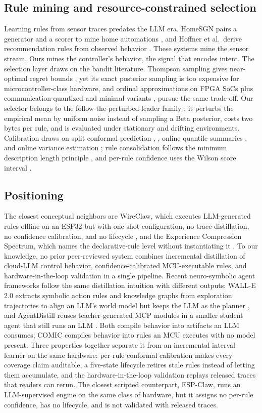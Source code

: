 \documentclass[11pt,a4paper]{article}
\begin{document}
\subsection{Rule mining and resource-constrained selection}

Learning rules from sensor traces predates the LLM era. HomeSGN pairs a
generator and a scorer to mine home automations \cite{15}, and Hoffner et
al.\ derive recommendation rules from observed behavior \cite{16}. These
systems mine the sensor stream. Ours mines the controller's behavior, the
signal that encodes intent. The selection layer draws on the bandit
literature. Thompson sampling gives near-optimal regret bounds \cite{17}, yet
its exact posterior sampling is too expensive for microcontroller-class
hardware, and ordinal approximations on FPGA SoCs \cite{18} plus
communication-quantized and minimal variants \cite{19}, \cite{20} pursue the
same trade-off. Our selector
belongs to the follow-the-perturbed-leader family \cite{21}: it perturbs the
empirical mean by uniform noise instead of sampling a Beta posterior, costs
two bytes per rule, and is evaluated under stationary and drifting
environments. Calibration draws on split conformal prediction \cite{22},
\cite{23}, online quantile summaries \cite{24}, and online variance estimation
\cite{25}; rule consolidation follows the minimum description length principle
\cite{26}, and per-rule confidence uses the Wilson score interval \cite{27}.

\subsection{Positioning}

The closest conceptual neighbors are WireClaw, which executes LLM-generated
rules offline on an ESP32 but with one-shot configuration, no trace
distillation, no confidence calibration, and no lifecycle \cite{12}, and the
Experience Compression Spectrum, which names the declarative-rule level
without instantiating it \cite{11}. To our knowledge, no prior peer-reviewed
system combines incremental distillation of cloud-LLM control behavior,
confidence-calibrated MCU-executable rules, and hardware-in-the-loop
validation in a single pipeline. Recent neuro-symbolic agent frameworks follow the same
distillation intuition with different outputs: WALL-E 2.0 extracts symbolic
action rules and knowledge graphs from exploration trajectories to align an
LLM's world model but keeps the LLM as the planner \cite{37}, and AgentDistill
reuses teacher-generated MCP modules in a smaller student agent that still
runs an LLM \cite{38}. Both compile behavior into artifacts an LLM consumes;
COMIC compiles behavior into rules an MCU executes with no model present.
Three properties together separate it from an incremental
interval learner on the same hardware: per-rule conformal calibration makes
every coverage claim auditable, a five-state lifecycle retires stale rules
instead of letting them accumulate, and the hardware-in-the-loop validation
replays released traces that readers can rerun. The closest scripted
counterpart, ESP-Claw, runs an LLM-supervised engine on the same class of
hardware, but it assigns no per-rule confidence, has no lifecycle, and is not
validated with released traces.
\end{document}
